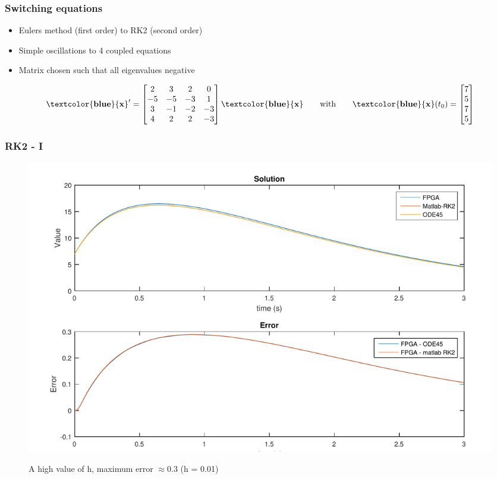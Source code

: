 \documentclass{beamer}[10]
\newcommand{\ve}[1]{\mathbf{\textcolor{blue}{#1}}}
\begin{document}
\begin{frame}
	\frametitle{Switching equations}
	
	\begin{itemize}
		\item Eulers method (first order) to RK2 (second order)
		\item Simple oscillations to 4 coupled equations
		\item Matrix chosen such that all eigenvalues negative
	\end{itemize}

	\begin{equation}
	\ve{x}' = \begin{bmatrix} 
	2 & 3 & 2 & 0 \\
	-5 & -5 & -3 & 1 \\
	3 & -1 & -2 & -3 \\
	4 & 2 & 2 & -3 \\
	\end{bmatrix} \ve{x} 
	\hspace{20pt} \text{with} \hspace{20pt} 
	\ve{x}(t_{0}) =\begin{bmatrix} 7 \\ 5 \\ 7 \\ 5 \end{bmatrix} 
	\end{equation}
	
\end{frame}

\begin{frame}
	\frametitle{RK2 - I}
	\begin{figure}
		\centering
		\includegraphics[width=\columnwidth]{figs/rk2_ts=0,01_os=1}
		\label{f:rk2_ts=0,01_os=1}
		\caption{A high value of h, maximum error $\approx 0.3$ (h = 0.01)}
	\end{figure}
\end{frame}
\end{document}
